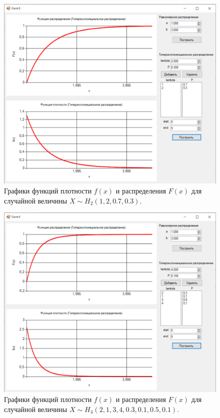 \documentclass[14pt, a4paper]{extarticle}
\begin{document}
\clearpage
\begin{figure}[h!]
	\begin{center}
		\includegraphics[scale=0.7]{pictures/p2.png}
	\end{center}
	\captionsetup{justification=centering}
	\caption{Графики функций плотности $f(x)$ и распределения $F(x)$ для случайной величины $X \sim H_2(1, 2, 0.7, 0.3)$.}
	\label{fig:p2}
\end{figure}

\clearpage
\begin{figure}[h!]
	\begin{center}
		\includegraphics[scale=0.7]{pictures/p3.png}
	\end{center}
	\captionsetup{justification=centering}
	\caption{Графики функций плотности $f(x)$ и распределения $F(x)$ для случайной величины  $X \sim H_4(2, 1, 3, 4, 0.3, 0.1, 0.5, 0.1)$.}
	\label{fig:p3}
\end{figure}
\end{document}
